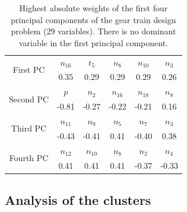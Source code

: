 \begin{table}[!ht]
  \centering
  \begin{tabular}{|c|c|c|c|c|c|}
    \hline
    \multirow{2}{*}{First PC}   & $n_{16}$ &  $t_{5}$ &  $n_{8}$  & $n_{10}$ & $n_3$\\
    & 0.35  & 0.29  & 0.29 & 0.29 & 0.26  \\
    \hline
    \multirow{2}{*}{Second PC}   & $p$ &  $n_{2}$ &  $n_{16}$  & $n_{18}$ & $n_8$\\
    & -0.81 & -0.27 & -0.22 & -0.21 &  0.16 \\
    \hline
    \multirow{2}{*}{Third PC}   & $n_{11}$ &  $n_{9}$ &  $n_{5}$  & $n_{7}$ & $n_{3}$\\
    & -0.43 & -0.41 & 0.41 & -0.40 & 0.38 \\
    \hline
    \multirow{2}{*}{Fourth PC}   & $n_{12}$ &  $n_{10}$ &  $n_{8}$  & $n_{2}$ & $n_{4}$\\
    & 0.41 & 0.41 & 0.41 & -0.37 &  -0.33 \\
    \hline
  \end{tabular}
  \caption{Highest absolute weights of the first four principal components 
    of the gear train design problem (29 variables). There is no 
    dominant variable in the first principal component.}
  \label{first4GTVPCs}
\end{table}




\subsection{Analysis of the clusters}
 

